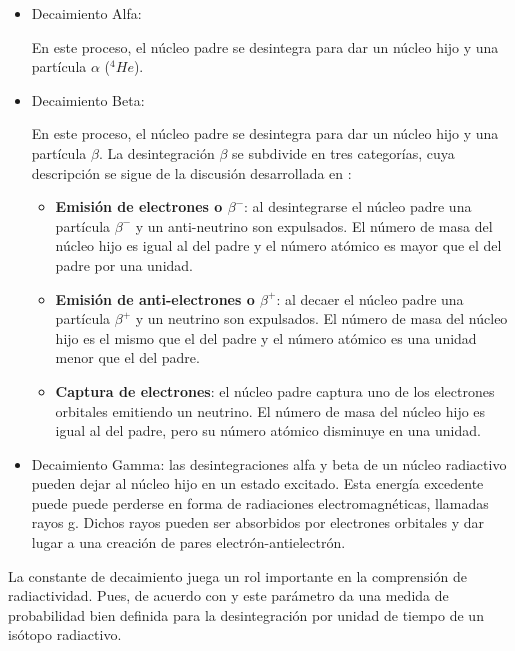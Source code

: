 \begin{itemize}
	\item Decaimiento Alfa:
	
	En este proceso, el núcleo padre se desintegra para dar un núcleo hijo y una partícula $\alpha$ ($^{4} He$). 
	
	\item Decaimiento Beta:
	
	En este proceso, el núcleo padre se desintegra para dar un núcleo hijo y una partícula $\beta $. La desintegración $\beta $ se subdivide en tres categorías, cuya descripción se sigue de la discusión desarrollada en \cite{Cottingham.2001, Krane.1987, Das.2009, Martin.2009}: 
	
    \begin{itemize}
    	\item \textbf{Emisión de electrones o $\beta^{-}$}: al desintegrarse el núcleo padre una partícula $\beta ^{-}$ y un anti-neutrino son expulsados. El número de masa del núcleo hijo es igual al del padre y el número atómico es mayor que el del padre por una unidad. 
    	
    	\item \textbf{Emisión de anti-electrones o $\beta^{+}$}: al decaer el núcleo padre una partícula $\beta^{+}$ y un neutrino son expulsados. El número de masa del núcleo hijo es el mismo que el del padre y el número atómico es una unidad menor que el del padre. 
    	
    	\item \textbf{Captura de electrones}: el núcleo padre captura uno de los electrones orbitales emitiendo un neutrino. El número de masa del núcleo hijo es igual al del padre, pero su número atómico disminuye en una unidad. 
 	\end{itemize}
 
	\item Decaimiento Gamma: las desintegraciones alfa y beta de un núcleo radiactivo pueden dejar al núcleo hijo en un estado excitado. Esta energía excedente puede puede perderse en forma de radiaciones electromagnéticas, llamadas rayos g. Dichos rayos pueden ser absorbidos por electrones orbitales y dar lugar a una creación de pares electrón-antielectrón.
\end{itemize}

La constante de decaimiento juega un rol importante en la comprensión de radiactividad. Pues, de acuerdo con \cite{Sanctis.2016} y \cite{Podgorsak.2016} este parámetro da una medida de probabilidad bien definida para la desintegración por unidad de tiempo de un isótopo radiactivo.

